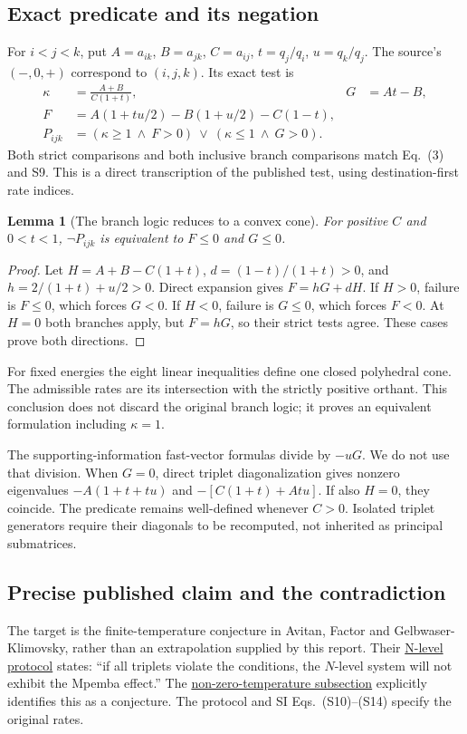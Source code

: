 \documentclass[11pt]{article}
\newtheorem{lemma}{Lemma}
\begin{document}
\subsection{Exact predicate and its negation}
For $i<j<k$, put $A=a_{ik}$, $B=a_{jk}$, $C=a_{ij}$, $t=q_j/q_i$, $u=q_k/q_j$. The source's $(-,0,+)$ correspond to $(i,j,k)$. Its exact test is
\begin{align*}
\kappa&=\frac{A+B}{C(1+t)},&G&=At-B,\\
F&=A(1+tu/2)-B(1+u/2)-C(1-t),\\
P_{ijk}&=(\kappa\geq1\ \land\ F>0)\ \lor\ (\kappa\leq1\ \land\ G>0).
\end{align*}
Both strict comparisons and both inclusive branch comparisons match Eq.~(3) and S9. This is a direct transcription of the published test, using destination-first rate indices.

\begin{lemma}[The branch logic reduces to a convex cone]
For positive $C$ and $0<t<1$, $\neg P_{ijk}$ is equivalent to $F\leq0$ and $G\leq0$.
\end{lemma}
\begin{proof}
Let $H=A+B-C(1+t)$, $d=(1-t)/(1+t)>0$, and $h=2/(1+t)+u/2>0$. Direct expansion gives $F=hG+dH$. If $H>0$, failure is $F\leq0$, which forces $G<0$. If $H<0$, failure is $G\leq0$, which forces $F<0$. At $H=0$ both branches apply, but $F=hG$, so their strict tests agree. These cases prove both directions.
\end{proof}
For fixed energies the eight linear inequalities define one closed polyhedral cone. The admissible rates are its intersection with the strictly positive orthant. This conclusion does not discard the original branch logic; it proves an equivalent formulation including $\kappa=1$.

The supporting-information fast-vector formulas divide by $-uG$. We do not use that division. When $G=0$, direct triplet diagonalization gives nonzero eigenvalues $-A(1+t+tu)$ and $-[C(1+t)+Atu]$. If also $H=0$, they coincide. The predicate remains well-defined whenever $C>0$. Isolated triplet generators require their diagonals to be recomputed, not inherited as principal submatrices.

\subsection{Precise published claim and the contradiction}\label{sec:claimscope}
The target is the finite-temperature conjecture in Avitan, Factor and Gelbwaser-Klimovsky, rather than an extrapolation supplied by this report. Their \href{https://arxiv.org/html/2603.04567v1#Sx3}{N-level protocol} states: ``if all triplets violate the conditions, the $N$-level system will not exhibit the Mpemba effect.'' The \href{https://arxiv.org/html/2603.04567v1#Sx3.SSx2}{non-zero-temperature subsection} explicitly identifies this as a conjecture. The protocol and SI Eqs.~(S10)--(S14) specify the original rates.
\end{document}
